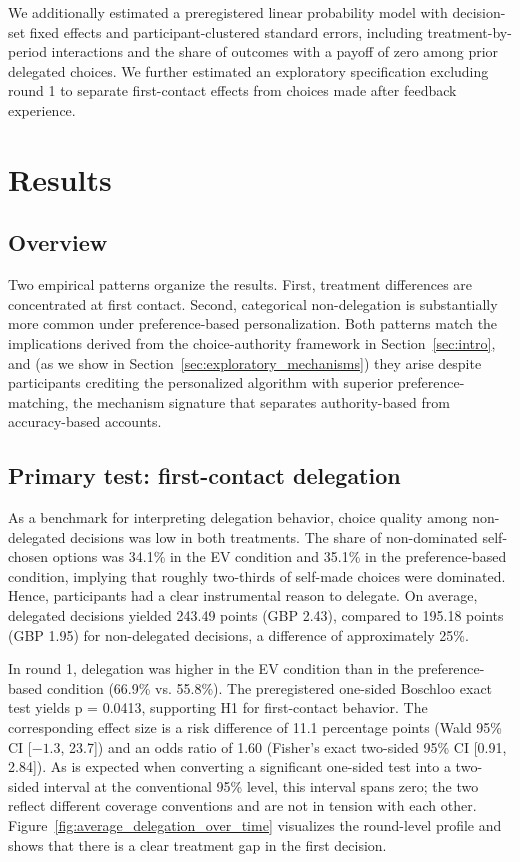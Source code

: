 \documentclass[a4paper, 12pt, fleqn]{article}
\theoremstyle{definition}
\newcommand{\inew}[1]{{\color{blue} #1\color{black}}}
\begin{document}
We additionally estimated a preregistered linear probability model with decision-set fixed effects and participant-clustered standard errors, including treatment-by-period interactions and the share of outcomes with a payoff of zero among prior delegated choices. We further estimated an exploratory specification excluding round 1 to separate first-contact effects from choices made after feedback experience.

\section{Results}
\label{sec:results}

\subsection{Overview}
Two empirical patterns organize the results. First, treatment differences are concentrated at first contact. Second, categorical non-delegation is substantially more common under preference-based personalization. Both patterns match the implications derived from the choice-authority framework in Section~\ref{sec:intro}, and (as we show in Section~\ref{sec:exploratory_mechanisms}) they arise despite participants crediting the personalized algorithm with superior preference-matching, the mechanism signature that separates authority-based from accuracy-based accounts.

\subsection{Primary test: first-contact delegation}
As a benchmark for interpreting delegation behavior, choice quality among non-delegated decisions was low in both treatments. The share of non-dominated self-chosen options was 34.1\% in the EV condition and 35.1\% in the preference-based condition, implying that roughly two-thirds of self-made choices were dominated. Hence, participants had a clear instrumental reason to delegate. On average, delegated decisions yielded 243.49 points (GBP 2.43), compared to 195.18 points (GBP 1.95) for non-delegated decisions, a difference of approximately 25\%.

In round 1, delegation was higher in the EV condition than in the preference-based condition (66.9\% vs. 55.8\%). The preregistered one-sided Boschloo exact test yields p = 0.0413, supporting H1 for first-contact behavior. \inew{The corresponding effect size is a risk difference of 11.1 percentage points (Wald 95\% CI [$-1.3$, 23.7]) and an odds ratio of 1.60 (Fisher's exact two-sided 95\% CI [0.91, 2.84]). As is expected when converting a significant one-sided test into a two-sided interval at the conventional 95\% level, this interval spans zero; the two reflect different coverage conventions and are not in tension with each other.}
Figure~\ref{fig:average_delegation_over_time} visualizes the round-level profile and shows that there is a clear treatment gap in the first decision.
\end{document}
